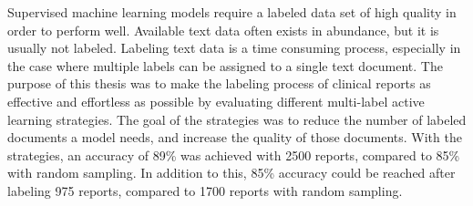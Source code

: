 Supervised machine learning models require a labeled data set of high quality in order to perform well.
Available text data often exists in abundance, but it is usually not labeled.
Labeling text data is a time consuming process, especially in the case where multiple labels can be assigned to a single text document.
The purpose of this thesis was to make the labeling process of clinical reports as effective and effortless as possible by evaluating different multi-label active learning strategies.
The goal of the strategies was to reduce the number of labeled documents a model needs, and increase the quality of those documents.
With the strategies, an accuracy of 89\% was achieved with 2500 reports, compared to 85\% with random sampling.
In addition to this, 85\% accuracy could be reached after labeling 975 reports, compared to 1700 reports with random sampling.